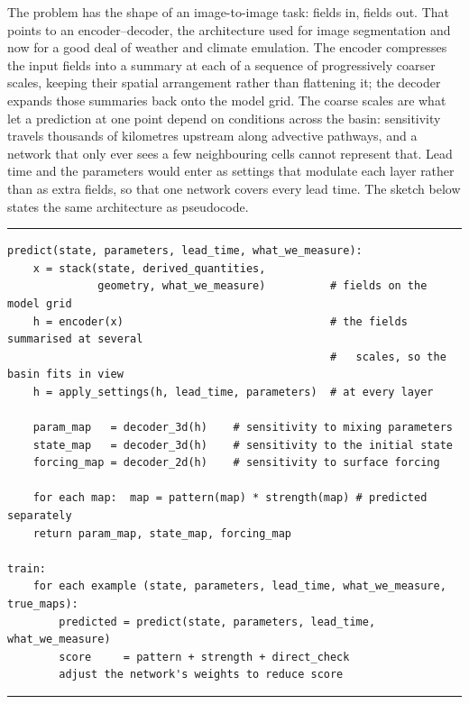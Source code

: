 The problem has the shape of an image-to-image task: fields in, fields out. That points
to an encoder--decoder, the architecture used for image segmentation and now for a good
deal of weather and climate emulation. The encoder compresses the input fields into a
summary at each of a sequence of progressively coarser scales, keeping their spatial
arrangement rather than flattening it; the decoder expands those summaries back onto the
model grid. The coarse scales are what let a prediction at one point depend on conditions
across the basin: sensitivity travels thousands of kilometres upstream along advective
pathways, and a network that only ever sees a few neighbouring cells cannot represent
that. Lead time and the parameters would enter as settings that modulate each layer
rather than as extra fields, so that one network covers every lead time. The sketch below
states the same architecture as pseudocode.

\smallskip
\begin{center}\begin{minipage}{0.97\textwidth}
\hrule\vspace{3pt}
{\footnotesize\begin{verbatim}
predict(state, parameters, lead_time, what_we_measure):
    x = stack(state, derived_quantities,
              geometry, what_we_measure)          # fields on the model grid
    h = encoder(x)                                # the fields summarised at several
                                                  #   scales, so the basin fits in view
    h = apply_settings(h, lead_time, parameters)  # at every layer

    param_map   = decoder_3d(h)    # sensitivity to mixing parameters
    state_map   = decoder_3d(h)    # sensitivity to the initial state
    forcing_map = decoder_2d(h)    # sensitivity to surface forcing

    for each map:  map = pattern(map) * strength(map) # predicted separately
    return param_map, state_map, forcing_map

train:
    for each example (state, parameters, lead_time, what_we_measure, true_maps):
        predicted = predict(state, parameters, lead_time, what_we_measure)
        score     = pattern + strength + direct_check
        adjust the network's weights to reduce score
\end{verbatim}}
\vspace{-8pt}\hrule
\end{minipage}\end{center}
